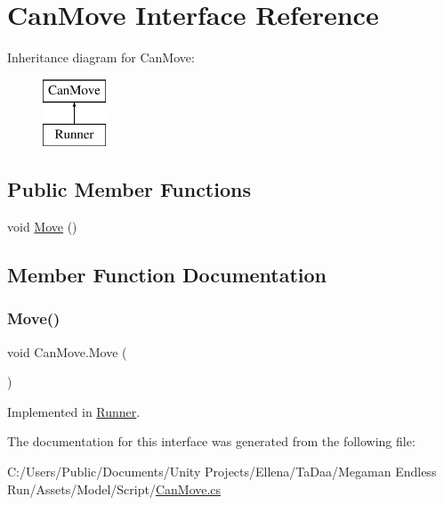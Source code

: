 \hypertarget{interface_can_move}{}\section{Can\+Move Interface Reference}
\label{interface_can_move}
Inheritance diagram for Can\+Move\+:\begin{figure}[H]
\begin{center}
\leavevmode
\includegraphics[height=2.000000cm]{interface_can_move}
\end{center}
\end{figure}
\subsection*{Public Member Functions}
\begin{DoxyCompactItemize}
\item 
void \hyperlink{interface_can_move_a2c40a4dc4684e8f04e31ff59d4ec74e0}{Move} ()
\end{DoxyCompactItemize}


\subsection{Member Function Documentation}
\hypertarget{interface_can_move_a2c40a4dc4684e8f04e31ff59d4ec74e0}{}\label{interface_can_move_a2c40a4dc4684e8f04e31ff59d4ec74e0} 
\subsubsection{\texorpdfstring{Move()}{Move()}}
{\footnotesize\ttfamily void Can\+Move.\+Move (\begin{DoxyParamCaption}{ }\end{DoxyParamCaption})}



Implemented in \hyperlink{class_runner_add0c89849fa2e023ed488ba80c7daf4a}{Runner}.



The documentation for this interface was generated from the following file\+:\begin{DoxyCompactItemize}
\item 
C\+:/\+Users/\+Public/\+Documents/\+Unity Projects/\+Ellena/\+Ta\+Daa/\+Megaman Endless Run/\+Assets/\+Model/\+Script/\hyperlink{_can_move_8cs}{Can\+Move.\+cs}\end{DoxyCompactItemize}
